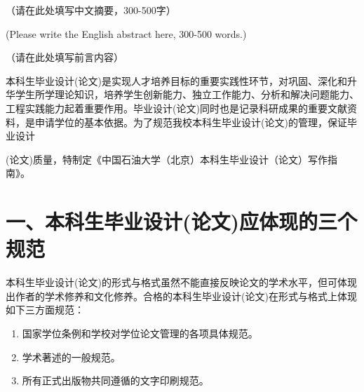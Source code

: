 \documentclass{cupb-thesis}
\begin{document}

\makecover

\makestatement

\begin{cnabstract}
（请在此处填写中文摘要，300-500字）
\end{cnabstract}

\begin{enabstract}
(Please write the English abstract here, 300-500 words.)
\end{enabstract}

\tableofcontents

\begin{preface}
（请在此处填写前言内容）
\end{preface}

\mainmatterstart

本科生毕业设计(论文)是实现人才培养目标的重要实践性环节，对巩固、深化和升华学生所学理论知识，培养学生创新能力、独立工作能力、分析和解决问题能力、工程实践能力起着重要作用。毕业设计(论文)同时也是记录科研成果的重要文献资料，是申请学位的基本依据。为了规范我校本科生毕业设计(论文)的管理，保证毕业设计

(论文)质量，特制定《中国石油大学（北京）本科生毕业设计（论文）写作指南》。

\section{一、本科生毕业设计(论文)应体现的三个规范}

本科生毕业设计(论文)的形式与格式虽然不能直接反映论文的学术水平，但可体现出作者的学术修养和文化修养。合格的本科生毕业设计(论文)在形式与格式上体现如下三方面规范：

\begin{enumerate}[label=\arabic*.]
  \item 国家学位条例和学校对学位论文管理的各项具体规范。
  \item 学术著述的一般规范。
  \item 所有正式出版物共同遵循的文字印刷规范。
\end{enumerate}
\end{document}
